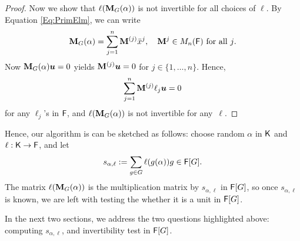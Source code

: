 \begin{proof}
  Now we show that $\ell(\mat M_G(\alpha))$ is not invertible for all
  choices of $\ell$. By Equation \eqref{Eq:PrimElm}, we can write 
  $$\mat M_G(\alpha) = \sum_{j = 1}^n \mat M^{(j)} \bar x^j, \quad 
\mat M^{j} \in M_{n}(\F) \text{~for all $j$}.$$ 
Now $\mat M_G(\alpha) \boldsymbol{u} =0$ yields $\mat M^{(j)}\boldsymbol{u} = 0$ for $j \in \lbrace 1, \ldots , n \rbrace$. Hence,
$$\sum_{j = 1}^n \mat M^{(j)} \ell_j \boldsymbol{u} = 0$$ for any 
$\ell_j$'s in ${\mathsf{F}}$, and $\ell(\mat M_G(\alpha))$ is not invertible for any~$\ell$.
\end{proof} 

Hence, our algorithm is can be sketched as follows: choose random
$\alpha$ in ${\mathsf{K}}$ and $\ell: {\mathsf{K}}\to{\mathsf{F}}$, and let 
$$s_{\alpha,\ell}:=\sum_{g \in G} \ell(g(\alpha))g \in {\mathsf{F}}[G].$$ The
matrix $\ell(\mat M_G (\alpha))$ is the multiplication matrix by
$s_{\alpha,\ell}$ in ${\mathsf{F}}[G]$, so once $s_{\alpha,\ell}$ is known, we
are left with testing the whether it is a unit in ${\mathsf{F}}[G]$.

In the next two sections, we address the two questions highlighted above:
computing $s_{\alpha,\ell}$, and invertibility test in ${\mathsf{F}}[G]$.


